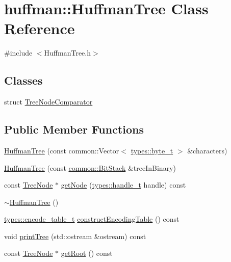\hypertarget{classhuffman_1_1HuffmanTree}{}\section{huffman\+:\+:Huffman\+Tree Class Reference}
\label{classhuffman_1_1HuffmanTree}


{\ttfamily \#include $<$Huffman\+Tree.\+h$>$}

\subsection*{Classes}
\begin{DoxyCompactItemize}
\item 
struct \hyperlink{structhuffman_1_1HuffmanTree_1_1TreeNodeComparator}{Tree\+Node\+Comparator}
\end{DoxyCompactItemize}
\subsection*{Public Member Functions}
\begin{DoxyCompactItemize}
\item 
\hyperlink{classhuffman_1_1HuffmanTree_ac7a0e15e098577075ed09dfdfbb7574d}{Huffman\+Tree} (const common\+::\+Vector$<$ \hyperlink{namespacehuffman_1_1types_a198fb2bbef1012ab1696124836c56f0d}{types\+::byte\+\_\+t} $>$ \&characters)
\item 
\hyperlink{classhuffman_1_1HuffmanTree_ac29dc870d49acc9c86f4bbba88466c24}{Huffman\+Tree} (const \hyperlink{classcommon_1_1BitStack}{common\+::\+Bit\+Stack} \&tree\+In\+Binary)
\item 
const \hyperlink{classhuffman_1_1TreeNode}{Tree\+Node} $\ast$ \hyperlink{classhuffman_1_1HuffmanTree_a0c962ba0de18315a0d8a9957cf05ce62}{get\+Node} (\hyperlink{namespacehuffman_1_1types_a41dc8ca07e19043152b0a5c8b5fec90b}{types\+::handle\+\_\+t} handle) const 
\item 
\hyperlink{classhuffman_1_1HuffmanTree_a5b8d06384d4bc6a69ba64d784576e112}{$\sim$\+Huffman\+Tree} ()
\item 
\hyperlink{namespacehuffman_1_1types_a2d111e21190970dfeb935ef0786973c0}{types\+::encode\+\_\+table\+\_\+t} \hyperlink{classhuffman_1_1HuffmanTree_ad1386a441f38495dce043e48d92b589d}{construct\+Encoding\+Table} () const 
\item 
void \hyperlink{classhuffman_1_1HuffmanTree_a3a39e931986f2f496450c8e8529bfb13}{print\+Tree} (std\+::ostream \&ostream) const 
\item 
const \hyperlink{classhuffman_1_1TreeNode}{Tree\+Node} $\ast$ \hyperlink{classhuffman_1_1HuffmanTree_a1a57f1570c185a7c41828ff198762723}{get\+Root} () const 
\end{DoxyCompactItemize}


